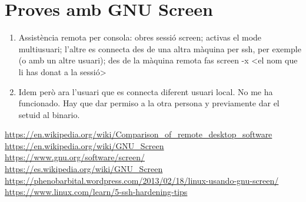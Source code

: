 \documentclass[a4paper]{article}
\begin{document}

\section{Proves amb GNU Screen}

\begin{enumerate}
	\item Assistència remota per consola: obres sessió screen; activas el mode multiusuari; l'altre es connecta des de una altra màquina per ssh, per exemple (o amb un altre usuari); des de la màquina remota fas screen -x <el nom que li has donat a la sessió>
	\item Idem però ara l'usuari que es connecta  diferent usuari local. No me ha funcionado. Hay que dar permiso a la otra persona y previamente dar el setuid al binario.
\end{enumerate}

\begin{thebibliography}{99}
	 
	 \url{https://en.wikipedia.org/wiki/Comparison_of_remote_desktop_software}
	 \url{https://en.wikipedia.org/wiki/GNU_Screen} 
	 \url{https://www.gnu.org/software/screen/}
	 \url{https://es.wikipedia.org/wiki/GNU_Screen}
	 \url{https://phenobarbital.wordpress.com/2013/02/18/linux-usando-gnu-screen/}
	\url{https://www.linux.com/learn/5-ssh-hardening-tips}
\end{thebibliography}
\end{document}
